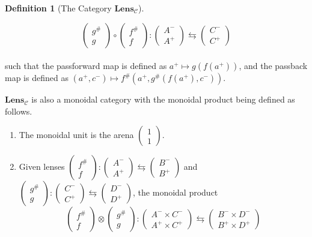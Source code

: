 \documentclass[12pt]{article}
\theoremstyle{definition}
\newtheorem{definition}{Definition}
\begin{document}
\begin{definition}[The Category $\textbf{Lens}_\mathcal{C}$]
\begin{enumerate}
              $$\begin{pmatrix}g^{\#}\\g\end{pmatrix} \circ \begin{pmatrix}f^{\#}\\f\end{pmatrix}:\begin{pmatrix}A^-\\A^+\end{pmatrix}\leftrightarrows\begin{pmatrix}C^-\\C^+\end{pmatrix}$$
              \\such that the passforward map is defined as $a^+ \mapsto g(f(a^+))$,
              and the passback map is defined as $(a^+, c^-) \mapsto f^\#(a^+, g^\#(f(a^+), c^-))$.
    \end{enumerate}
    $\textbf{Lens}_{\mathcal{C}}$ is also a monoidal category with the monoidal product being defined as follows.
    \begin{enumerate}
        \item The monoidal unit is the arena $\begin{pmatrix}1\\1\end{pmatrix}$.
        \item Given lenses $\begin{pmatrix}f^{\#}\\f\end{pmatrix}:\begin{pmatrix}A^-\\A^+\end{pmatrix}\leftrightarrows\begin{pmatrix}B^-\\B^+\end{pmatrix}$
              and $\begin{pmatrix}g^{\#}\\g\end{pmatrix}:\begin{pmatrix}C^-\\C^+\end{pmatrix}\leftrightarrows\begin{pmatrix}D^-\\D^+\end{pmatrix}$, the monoidal product
              $$\begin{pmatrix}f^{\#}\\f\end{pmatrix} \otimes \begin{pmatrix}g^{\#}\\g\end{pmatrix}:\begin{pmatrix}A^- \times C^-\\A^+ \times C^+\end{pmatrix}\leftrightarrows\begin{pmatrix}B^- \times D^-\\B^+ \times D^+\end{pmatrix}$$

\end{enumerate}
\end{definition}
\end{document}
